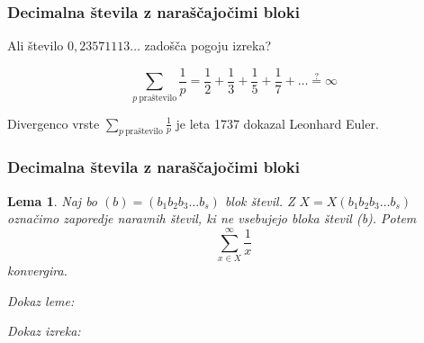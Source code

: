 \documentclass{beamer}
\newtheorem{lema}{Lema}
\begin{document}
\begin{frame}\frametitle{Decimalna števila z naraščajočimi bloki}

    Ali število $0,23571113\dots$ zadošča pogoju izreka?
    \pause
    
    \[
        \sum_{p \ \text{praštevilo}}\frac{1}{p} =
        \frac{1}{2} + \frac{1}{3} + \frac{1}{5} + \frac{1}{7} + \dots \overset{?}{=} \infty \]
    \pause

    Divergenco vrste $\sum_{p \ \text{praštevilo}}\frac{1}{p}$ je leta 1737 dokazal Leonhard Euler.

\end{frame}

\begin{frame}\frametitle{Decimalna števila z naraščajočimi bloki}

    \begin{lema}
        Naj bo $(b) = (b_1b_2b_3 \dots b_s)$ blok števil. Z $X = X(b_1b_2b_3 \dots b_s)$ označimo
        zaporedje naravnih števil, ki ne vsebujejo bloka števil (b). Potem 
        \[ \sum_{x \in X}^{\infty} \frac{1}{x}\] konvergira.
    \end{lema}
    \emph{Dokaz leme:}
    \newline
    \newline
    \newline
    \newline
    \newline
    \newline
    \newline
    \newline
\end{frame}

\begin{frame}
    \emph{Dokaz izreka:}
    \newline
    \newline
    \newline
    \newline
    \newline
    \newline
    \newline
    \newline
    \newline
    \newline
    \newline
    \newline
    \newline
    \newline
    \newline
    \newline
\end{frame}
\end{document}
